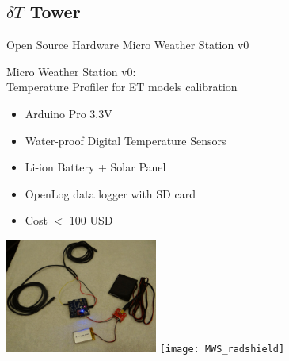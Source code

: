 \documentclass[xcolor=dvipsnames,beamer]{beamer} %
\begin{document}
\subsection{ $\delta T$ Tower}
\begin{frame}[fragile]{Open Source Hardware Micro Weather Station v0}

Micro Weather Station v0:\\
Temperature Profiler for ET models calibration
\vspace{5mm}
\begin{itemize}
 \item Arduino Pro 3.3V
 \item Water-proof Digital Temperature Sensors
 \item Li-ion Battery + Solar Panel
 \item OpenLog data logger with SD card
 \item Cost $<$ 100 USD
\end{itemize}
\begin{flushright}
  \includegraphics[width=5cm]{MWS}
  \hspace{5mm}
  \texttt{[image: MWS\_radshield]}
\end{flushright}
\end{frame}
\end{document}

